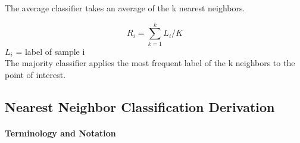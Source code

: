\documentclass{report}
\begin{document}
The average classifier takes an average of the k nearest neighbors.

\begin{equation}
R_i = \sum_{k=1}^k L_i / K
\end{equation}
$L_i$ = label of sample i
\\
The majority classifier applies the most frequent label of the k neighbors to the point of interest. 

\subsection*{Nearest Neighbor Classification Derivation}

\paragraph*{Terminology and Notation }\cite{4}
\end{document}
